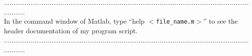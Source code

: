 \documentclass[a4paper,12pt]{article} %
\begin{document}
............................................................................................................................................\\
In the command window of Matlab, type ``help $<$\verb|file_name.m|$>$'' to see the header documentation of my program script.\\
............................................................................................................................................
\end{document}
